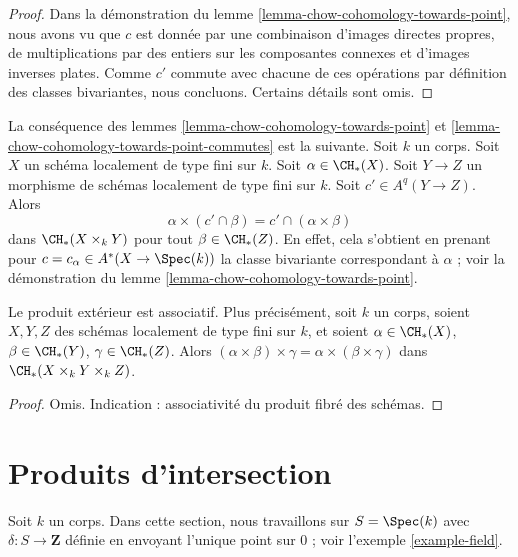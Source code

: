 \begin{proof}
Dans la démonstration du lemme \ref{lemma-chow-cohomology-towards-point},
nous avons vu que $c$ est donnée par une combinaison d'images
directes propres, de multiplications par des entiers sur les composantes
connexes et d'images inverses plates. Comme $c'$ commute avec chacune de
ces opérations par définition des classes bivariantes, nous concluons.
Certains détails sont omis.
\end{proof}

\begin{remark}
\label{remark-commuting-exterior}
La conséquence des lemmes \ref{lemma-chow-cohomology-towards-point}
et \ref{lemma-chow-cohomology-towards-point-commutes} est la suivante.
Soit $k$ un corps. Soit $X$ un schéma localement de type fini sur $k$.
Soit $\alpha \in \CH_*(X)$. Soit $Y \to Z$ un morphisme de schémas
localement de type fini sur $k$. Soit $c' \in A^q(Y \to Z)$. Alors
$$
\alpha \times (c' \cap \beta) = c' \cap (\alpha \times \beta)
$$
dans $\CH_*(X \times_k Y)$ pour tout $\beta \in \CH_*(Z)$. En effet, cela
s'obtient en prenant pour $c = c_\alpha \in A^*(X \to \Spec(k))$ la classe bivariante
correspondant à $\alpha$ ; voir la démonstration du
lemme \ref{lemma-chow-cohomology-towards-point}.
\end{remark}

\begin{lemma}
\label{lemma-exterior-product-associative}
Le produit extérieur est associatif. Plus précisément, soit $k$ un corps,
soient $X, Y, Z$ des schémas localement de type fini sur $k$, et soient
$\alpha \in \CH_*(X)$, $\beta \in \CH_*(Y)$, $\gamma \in \CH_*(Z)$.
Alors $(\alpha \times \beta) \times \gamma =
\alpha \times (\beta \times \gamma)$ dans $\CH_*(X \times_k Y \times_k Z)$.
\end{lemma}

\begin{proof}
Omis. Indication : associativité du produit fibré des schémas.
\end{proof}







\section{Produits d'intersection}
\label{section-intersection-product}

\noindent
Soit $k$ un corps. Dans cette section, nous travaillons sur $S = \Spec(k)$ avec
$\delta : S \to \mathbf{Z}$ définie en envoyant l'unique point sur $0$ ; voir
l'exemple \ref{example-field}.

